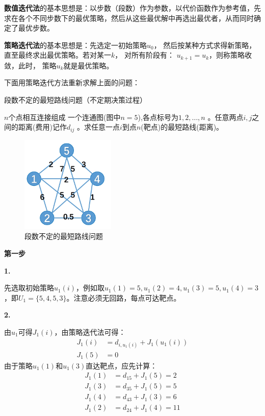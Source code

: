 \textbf{数值迭代法}的基本思想是：以步数（段数）作为参数，以代价函数作为参考值，先求在各个不同步数下的最优策略，然后从这些最优解中再选出最优者，从而同时确定了最优步数。

\textbf{策略迭代法}的基本思想是：先选定一初始策略$u_0$， 然后按某种方式求得新策略，直至最终求出最优策略。若对某一$k$， 对所有阶段有： $u_{k+1}=u_k$，则称策略收敛，此时， 策略$u_k$就是最优策略。

下面用策略迭代方法重新求解上面的问题：

\begin{example}

    段数不定的最短路线问题（不定期决策过程）

    $n$个点相互连接组成 一个连通图(图中$n=5$),各点标号为$1,2,…, n$ 。任意两点$i,j$之间的距离(费用)记作$d_{ij}$ 。求任意一点$i$到点$n$(靶点)的最短路线(距离)。

    \begin{figure}[ht]
        \centering
        \includegraphics[width=0.4\textwidth]{pic/1.2.3.png}
        \caption{段数不定的最短路线问题}
    \end{figure}

    \textbf{第一步}

    \textbf{1.}

    先选取初始策略$u_1(i)$，例如取$u_1(1)=5,u_1(2)=4,u_1(3)=5,u_1(4)=3$，即$U_1=\{5,4,5,3\}$。注意必须无回路，每点可达靶点。

    \textbf{2.}

    由$u_1$可得$J_1(i)$，由策略迭代法可得：
    \begin{equation}
        \begin{aligned}
            J_1(i) & = d_{i,u_1(i)}+J_1(u_1(i)) \\
            J_1(5) & = 0
        \end{aligned}
    \end{equation}
    由于策略$u_1(1)$和$u_1(3)$直达靶点，应先计算：
    \begin{equation}
        \begin{aligned}
            J_1(1) & = d_{15}+J_1(5) = 2  \\
            J_1(3) & = d_{35}+J_1(5) = 5  \\
            J_1(4) & = d_{43}+J_1(3) = 6  \\
            J_1(2) & = d_{24}+J_1(4) = 11 \\
        \end{aligned}
    \end{equation}


\end{example}
